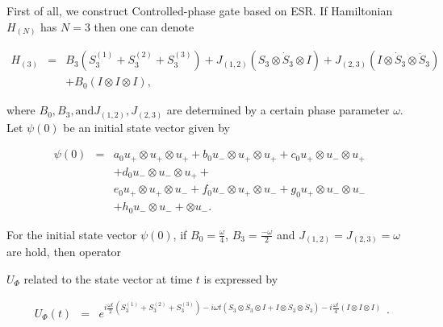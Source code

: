 First of all, we construct Controlled-phase gate based on ESR. If Hamiltonian $H_{(N)}

$ has $N=3$ then one can denote 

\begin{eqnarray*}

H_{(3)} &=&B_{3}(S_{3}^{(1)}+S_{3}^{(2)}+S_{3}^{(3)})+J_{(1,2)}(S_{3}\otimes 

\dot{S}_{3}\otimes I)+J_{(2,3)}(I\otimes \dot{S}_{3}\otimes \ddot{S}_{3}) \\

&&+B_{0}(I\otimes I\otimes I),

\end{eqnarray*}%

where $B_{0},B_{3},\mbox{and}J_{(1,2)}, J_{(2,3)}$ are determined by a certain phase parameter $\omega $. Let $\psi (0)$ be an initial state vector given by  

\begin{eqnarray*}

\psi (0) &=&a_{0}u_{+}\otimes u_{+}\otimes u_{+}+b_{0}u_{-}\otimes

u_{+}\otimes u_{+}+c_{0}u_{+}\otimes u_{-}\otimes u_{+} \\

&&+d_{0}u_{-}\otimes u_{-}\otimes u_{+}+ \\

&&e_{0}u_{+}\otimes u_{+}\otimes u_{-}+f_{0}u_{-}\otimes u_{+}\otimes

u_{-}+g_{0}u_{+}\otimes u_{-}\otimes u_{-} \\

&&+h_{0}u_{-}\otimes u_{-}+\otimes u_{-}.

\end{eqnarray*}%

For the initial state vector $\psi (0)$, if $B_{0}=\frac{\omega }{4}$, $B_{3}=%

\frac{-\omega }{2}$ and $J_{(1,2)}=J_{(2,3)}=\omega $ are hold, then operator 

$U_{\Phi }$ related to the state vector at time $t$ is expressed by 

\[

\begin{array}{lll}

U_{\Phi }(t) & = & e^{i\frac{\omega t}{2}%

(S_{3}^{(1)}+S_{3}^{(2)}+S_{3}^{(3)})-i\omega t(S_{3}\otimes \dot{S}%

_{3}\otimes I+I\otimes \dot{S}_{3}\otimes \ddot{S}_{3})-i\frac{\omega t}{4}%

(I\otimes I\otimes I)}%

\end{array}.%

\]%

